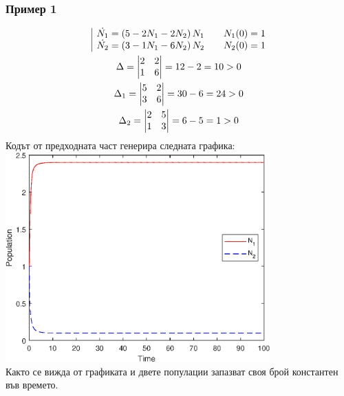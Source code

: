 \documentclass[a4paper,fleqn,12pt]{article}
\begin{document}
\subsubsection*{Пример 1}
\begin{gather*}
	\begin{array}{|l@{}}
	\dot{N_1} = \left(5 - 2N_1 - 2 N_2 \right) N_1 \qquad N_1(0) = 1\\
	\dot{N_2} = \left(3 - 1N_1 - 6 N_2 \right) N_2  \qquad N_2(0) = 1
	\end{array} \\
	\Delta = \begin{vmatrix} 2 & 2 \\ 1 & 6 \end{vmatrix} = 12 - 2 = 10 > 0 \\
	\Delta_1 = \begin{vmatrix}5 & 2 \\ 3 & 6 \end{vmatrix} = 30 - 6 = 24 > 0 \\
	\Delta_2 = \begin{vmatrix}2 & 5\\ 1 & 3 \end{vmatrix} = 6-5 = 1 > 0
\end{gather*}
Кодът от предходната част генерира следната графика: \\
\includegraphics [width=4in]{ecologyComp_01.eps} \\
Както се вижда от графиката и двете популации запазват своя брой константен във времето. 

\newpage
\end{document}
